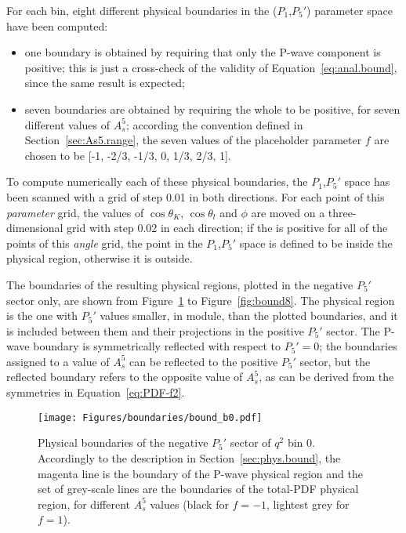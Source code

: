 
For each bin, eight different physical boundaries in the ($P_1$,$P_5'$) parameter space have been computed:
\begin{itemize}
\item one boundary is obtained by requiring that only the P-wave component is positive; this is just a cross-check of the validity of Equation~\ref{eq:anal.bound}, since the same result is expected;
\item seven boundaries are obtained by requiring the whole \pdf to be positive, for seven different values of $A_s^5$; according the convention defined in Section~\ref{sec:As5.range}, the seven values of the placeholder parameter $f$ are chosen to be [-1, -2/3, -1/3, 0, 1/3, 2/3, 1].
\end{itemize}

To compute numerically each of these physical boundaries, the $P_1$,$P_5'$ space has been scanned with a grid of step 0.01 in both directions.
For each point of this \textit{parameter} grid, the values of $\cos\theta_K$, $\cos\theta_l$ and $\phi$ are moved on a three-dimensional grid with step 0.02 in each direction; if the \pdf is positive for all of the points of this \textit{angle} grid, the point in the $P_1$,$P_5'$ space is defined to be inside the physical region, otherwise it is outside.

The boundaries of the resulting physical regions, plotted in the negative $P_5'$ sector only, are shown from Figure~\ref{fig:bound0} to Figure~\ref{fig:bound8}.
The physical region is the one with $P_5'$ values smaller, in module, than the plotted boundaries, and it is included between them and their projections in the positive $P_5'$ sector. 
The P-wave boundary is symmetrically reflected with respect to $P_5'=0$; the boundaries assigned to a value of $A_s^5$ can be reflected to the positive $P_5'$ sector, but the reflected boundary refers to the opposite value of $A_s^5$, as can be derived from the symmetries in Equation~\ref{eq:PDF-f2}.

\begin{figure}[!hbt]
  \centering
  \texttt{[image: Figures/boundaries/bound\_b0.pdf]}
  \caption{Physical boundaries of the negative $P_5'$ sector of $q^2$ bin 0.
    Accordingly to the description in Section~\ref{sec:phys.bound}, the magenta line is the boundary of the P-wave physical region and the set of grey-scale lines are the boundaries of the total-PDF physical region, for different $A_s^5$ values (black for $f=-1$, lightest grey for $f=1$).}
  \label{fig:bound0}
\end{figure}

